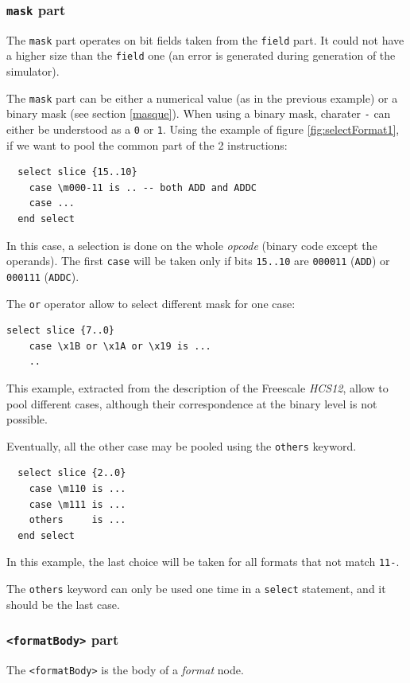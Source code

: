 \subsubsection{\texttt{mask} part}
The \texttt{mask} part operates on bit fields taken from the \texttt{field} part. It could not have a higher size than the \texttt{field} one (an error is generated during generation of the simulator).

The \texttt{mask} part can be either a numerical value (as in the previous example) or a binary mask (see section \ref{masque}). When using a binary mask, charater \texttt{-} can either be understood as a \texttt{0} or \texttt{1}. Using the example of figure \ref{fig:selectFormat1}, if we want to pool the common part of the 2 instructions:
\begin{lstlisting}
  select slice {15..10}
    case \m000-11 is .. -- both ADD and ADDC
    case ...
  end select
\end{lstlisting}
In this case, a selection is done on the whole \emph{opcode} (binary code except the operands). The first \texttt{case} will be taken only if bits \texttt{15..10} are \texttt{000011} (\texttt{ADD}) or \texttt{000111} (\texttt{ADDC}).

The \texttt{or} operator allow to select different mask for one case:
\begin{lstlisting}
select slice {7..0}
    case \x1B or \x1A or \x19 is ...
    ..
\end{lstlisting}
This example, extracted from the description of the Freescale \emph{HCS12}, allow to pool different cases, although their correspondence at the binary level is not possible.

Eventually, all the other case may be pooled using the \texttt{others} keyword.
\begin{lstlisting}
  select slice {2..0}
    case \m110 is ...
    case \m111 is ...
    others     is ...
  end select
\end{lstlisting}
In this example, the last choice will be taken for all formats that not match \texttt{11-}.

The \texttt{others} keyword can only be used one time in a \texttt{select} statement, and it should be the last case.

\subsubsection{\texttt{<formatBody>} part}
The \texttt{<formatBody>} is the body of a \emph{format} node.

